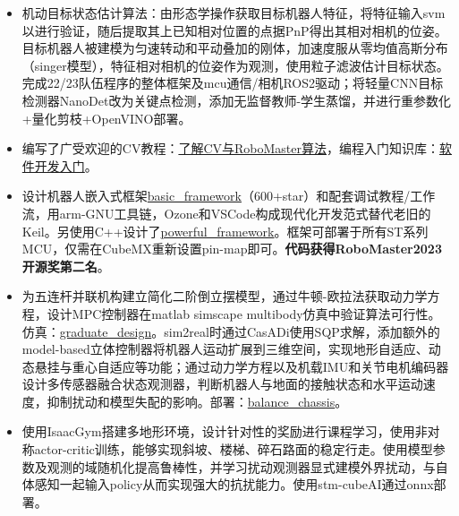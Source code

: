 \documentclass{resume}
\begin{document}
\begin{itemize}[parsep=0.5ex]
  \item 机动目标状态估计算法：由形态学操作获取目标机器人特征，将特征输入svm以进行验证，随后提取其上已知相对位置的点据PnP得出其相对相机的位姿。目标机器人被建模为匀速转动和平动叠加的刚体，加速度服从零均值高斯分布（singer模型），特征相对相机的位姿作为观测，使用粒子滤波估计目标状态。完成22/23队伍程序的整体框架及mcu通信/相机ROS2驱动；将轻量CNN目标检测器NanoDet改为关键点检测，添加无监督教师-学生蒸馏，并进行重参数化+量化剪枝+OpenVINO部署。
  \item 编写了广受欢迎的CV教程：\textcolor{blue}{{\href{https://github.com/NeoZng/vision_tutorial}{了解CV与RoboMaster算法}}}，编程入门知识库：\textcolor{blue}{\href{https://lapis-router-502.notion.site/6c2937aad3974144965860d1809dcaa9}{软件开发入门}}。
  \item 设计机器人嵌入式框架\textcolor{blue}{\href{https://gitee.com/hnuyuelurm/basic_framework}{basic\_framework}}（600+star）和配套调试教程/工作流，用arm-GNU工具链，Ozone和VSCode构成现代化开发范式替代老旧的Keil。另使用C++设计了\textcolor{blue}{\href{https://gitee.com/hnuyuelurm/powerful_framework}{powerful\_framework}}。框架可部署于所有ST系列MCU，仅需在CubeMX重新设置pin-map即可。\textbf{代码获得RoboMaster2023开源奖第二名}。
\end{itemize}

\begin{itemize}[parsep=0.5ex]
    \item 为五连杆并联机构建立简化二阶倒立摆模型，通过牛顿-欧拉法获取动力学方程，设计MPC控制器在matlab simscape multibody仿真中验证算法可行性。仿真：\textcolor{blue}{{\href{https://gitee.com/neozng1/finish-designing}{graduate\_design}}}。sim2real时通过CasADi使用SQP求解，添加额外的model-based立体控制器将机器人运动扩展到三维空间，实现地形自适应、动态悬挂与重心自适应等功能；通过动力学方程以及机载IMU和关节电机编码器设计多传感器融合状态观测器，判断机器人与地面的接触状态和水平运动速度，抑制扰动和模型失配的影响。部署：\textcolor{blue}{{\href{https://gitee.com/hnuyuelurm/balance_chassis}{balance\_chassis}}}。
    \item 使用IsaacGym搭建多地形环境，设计针对性的奖励进行课程学习，使用非对称actor-critic训练，能够实现斜坡、楼梯、碎石路面的稳定行走。使用模型参数及观测的域随机化提高鲁棒性，并学习扰动观测器显式建模外界扰动，与自体感知一起输入policy从而实现强大的抗扰能力。使用stm-cubeAI通过onnx部署。
\end{itemize}
\end{document}
